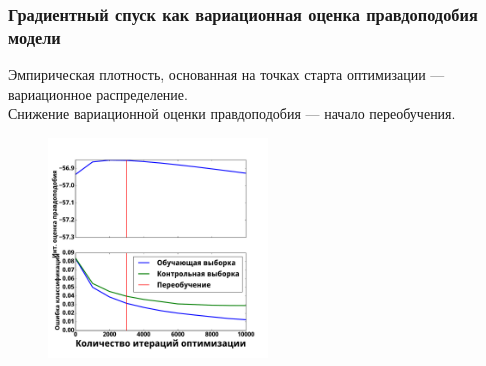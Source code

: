 \documentclass[usenames,dvipsnames,11pt,pdf,utf8,russian,aspectratio=43]{beamer}
\begin{document}
\begin{frame}

\frametitle{Градиентный спуск как вариационная оценка правдоподобия модели}
\small
Эмпирическая плотность, основанная на точках старта оптимизации --- вариационное распределение.\\
Снижение вариационной оценки правдоподобия ---  начало переобучения.


\begin{multicols}{2}

\begin{figure}
\vspace*{-0.2cm}
\end{figure}

\columnbreak


\begin{figure}
{\includegraphics[width=0.52\textwidth]{./slide_plots/sgd_show.pdf}}
\end{figure}
\end{multicols}
\end{frame}
\end{document}
